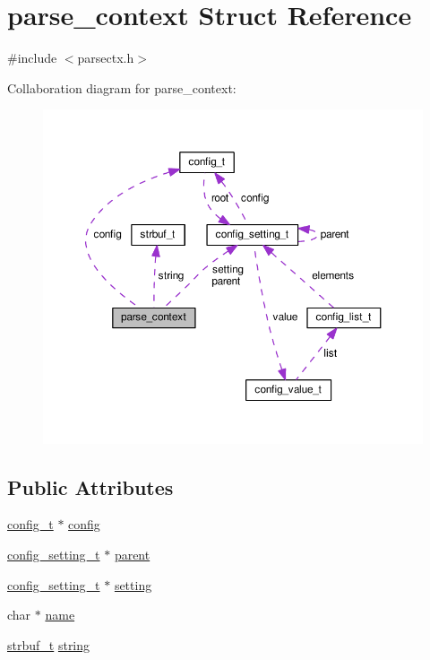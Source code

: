 \hypertarget{structparse__context}{\section{parse\-\_\-context Struct Reference}
\label{structparse__context}
}


{\ttfamily \#include $<$parsectx.\-h$>$}



Collaboration diagram for parse\-\_\-context\-:\nopagebreak
\begin{figure}[H]
\begin{center}
\leavevmode
\includegraphics[width=350pt]{structparse__context__coll__graph}
\end{center}
\end{figure}
\subsection*{Public Attributes}
\begin{DoxyCompactItemize}
\item 
\hyperlink{structconfig__t}{config\-\_\-t} $\ast$ \hyperlink{structparse__context_aa200e722cbeaa2486da5c03113a630de}{config}
\item 
\hyperlink{structconfig__setting__t}{config\-\_\-setting\-\_\-t} $\ast$ \hyperlink{structparse__context_a79ae4fb7bb22de08f7f99c8478187e22}{parent}
\item 
\hyperlink{structconfig__setting__t}{config\-\_\-setting\-\_\-t} $\ast$ \hyperlink{structparse__context_ab305aaa8de50d2803f062652b350d0e1}{setting}
\item 
char $\ast$ \hyperlink{structparse__context_a011e6f556f380ddb7ea6443310638d19}{name}
\item 
\hyperlink{structstrbuf__t}{strbuf\-\_\-t} \hyperlink{structparse__context_aa69b91bd3127bb918700074992130b4a}{string}
\end{DoxyCompactItemize}


